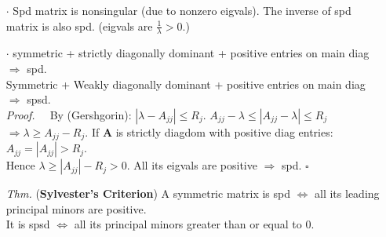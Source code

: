 \documentclass[a4paper, 11pt]{article}
\begin{document}
\begin{itemize}
	\item[$\cdot$] Spd matrix is nonsingular (due to nonzero eigvals). The inverse of spd matrix is also spd. (eigvals are $\frac{1}{\lambda}>0$.)

	\item[$\cdot$] symmetric + strictly diagonally dominant + positive entries on main diag $\Rightarrow$ spd. \\
	Symmetric + Weakly diagonally dominant + positive entries on main diag $\Rightarrow$ spsd. \\
	\textit{Proof.~~} By (Gershgorin): $|\lambda - A_{jj}| \leq R_j$. $A_{jj}-\lambda \leq |A_{jj}-\lambda| \leq R_j$ \\
	$\Rightarrow \lambda \geq A_{jj} - R_j$. If $\bm{A}$ is strictly diagdom with positive diag entries: $A_{jj}=|A_{jj}|>R_j$.\\
	Hence $\lambda \geq |A_{jj}|-R_j >0$. All its eigvals are positive $\Rightarrow$ spd. $\square$

	\item[\textit{Thm.}] (\textbf{Sylvester's Criterion}) A symmetric matrix is spd $\iff$ all its leading principal minors are positive. \\
	It is spsd $\iff$ all its principal minors greater than or equal to 0.
\end{itemize}
\end{document}
